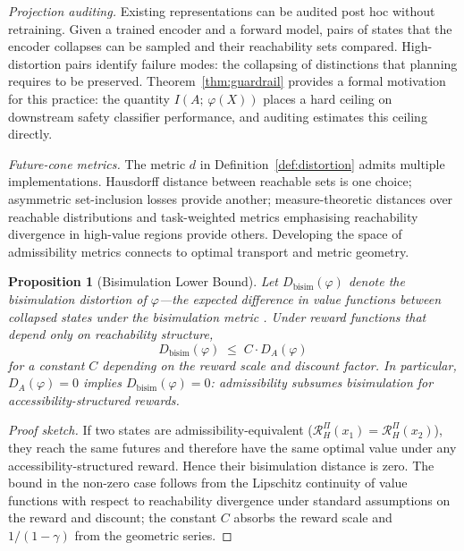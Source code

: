 \documentclass[11pt, a4paper]{article}
\theoremstyle{plain}
\newtheorem{proposition}{Proposition}
\theoremstyle{definition}
\theoremstyle{remark}
\newcommand{\RHP}{\mathcal{R}_H^\Pi}
\newcommand{\DA}{D_A(\varphi)}
\begin{document}
\emph{Projection auditing.} Existing representations can be audited post hoc
without retraining. Given a trained encoder and a forward model, pairs of states
that the encoder collapses can be sampled and their reachability sets compared.
High-distortion pairs identify failure modes: the collapsing of distinctions that
planning requires to be preserved. Theorem~\ref{thm:guardrail} provides a formal
motivation for this practice: the quantity $I(A;\, \varphi(X))$ places a hard
ceiling on downstream safety classifier performance, and auditing estimates this
ceiling directly.

\emph{Future-cone metrics.} The metric $d$ in Definition~\ref{def:distortion}
admits multiple implementations. Hausdorff distance between reachable sets is
one choice; asymmetric set-inclusion losses provide another; measure-theoretic
distances over reachable distributions and task-weighted metrics emphasising
reachability divergence in high-value regions provide others. Developing the
space of admissibility metrics connects to optimal transport and metric geometry.

\begin{proposition}[Bisimulation Lower Bound]
\label{prop:bisim_bound}
Let $D_{\text{bisim}}(\varphi)$ denote the bisimulation distortion of
$\varphi$---the expected difference in value functions between collapsed
states under the bisimulation metric \citep{ferns2004metrics}. Under
reward functions that depend only on reachability structure,
\begin{equation}
  D_{\text{bisim}}(\varphi) \;\leq\; C \cdot \DA
\end{equation}
for a constant $C$ depending on the reward scale and discount factor. In
particular, $\DA = 0$ implies $D_{\text{bisim}}(\varphi) = 0$: admissibility
subsumes bisimulation for accessibility-structured rewards.
\end{proposition}

\begin{proof}[Proof sketch]
If two states are admissibility-equivalent ($\RHP(x_1) = \RHP(x_2)$), they
reach the same futures and therefore have the same optimal value under any
accessibility-structured reward. Hence their bisimulation distance is zero.
The bound in the non-zero case follows from the Lipschitz continuity of value
functions with respect to reachability divergence under standard assumptions
on the reward and discount; the constant $C$ absorbs the reward scale and
$1/(1-\gamma)$ from the geometric series.
\end{proof}
\end{document}

